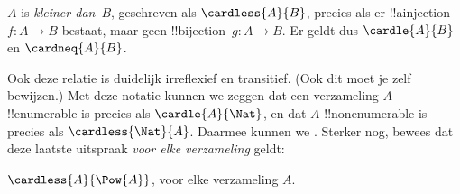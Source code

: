 \documentclass[openany]{memoir}
\begin{document}
\begin{defn}
$A$ is \emph{kleiner dan}~$B$, geschreven als $\cardless{A}{B}$, precies als
er !!a{injection}~$f\colon A \to B$ bestaat, maar geen
!!{bijection}~$g\colon A \to B$. Er geldt dus $\cardle{A}{B}$ en
$\cardneq{A}{B}$.
\end{defn}

Ook deze relatie is duidelijk irreflexief en transitief. (Ook dit moet je
zelf bewijzen.) Met deze notatie kunnen we zeggen dat een verzameling $A$
!!{enumerable} is precies als $\cardle{A}{\Nat}$, en dat $A$
!!{nonenumerable} is precies als $\cardless{\Nat}{A}$. Daarmee kunnen we
. Sterker nog,
\citet{Cantor1892} bewees dat deze laatste uitspraak \emph{voor elke
verzameling} geldt:

\begin{thm}[Cantor]
$\cardless{A}{\Pow{A}}$, voor elke verzameling $A$.
\end{thm}
\end{document}
